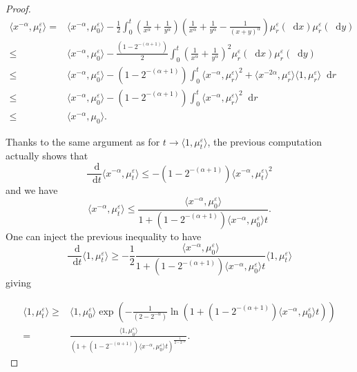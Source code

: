 \documentclass[a4paper,11pt, reqno]{amsart}
\newcommand{\eps}{\varepsilon}
\newcommand{\dd}{\mathop{}\!\mathrm{d}}
\newcommand{\1}{\mathbbm{1}}
\theoremstyle{plain}
\theoremstyle{definition}
\begin{document}
{\begin{proof}
  \begin{align*}
    \langle x^{- \alpha}, \mu^{\eps}_t \rangle = & \langle x^{-
    \alpha}, \mu^{\eps}_0 \rangle - \frac{1}{2} \int_0^t \left(
    \frac{1}{x^{\alpha}} + \frac{1}{y^{\alpha}} \right) \left(
    \frac{1}{x^{\alpha}} + \frac{1}{y^{\alpha}} - \frac{1}{(x + y)^{\alpha}}
    \right) \mu^{\eps}_r (\dd x) \mu^{\eps}_r (\dd y)\\
    \le & \langle x^{- \alpha}, \mu^{\eps}_0 \rangle - \frac{(1 -
    2^{- (\alpha + 1)})}{2} \int_0^t \left( \frac{1}{x^{\alpha}} +
    \frac{1}{y^{\alpha}} \right)^2 \mu^{\eps}_r (\dd x)
    \mu^{\eps}_r (\dd y)\\
    \le & \langle x^{- \alpha}, \mu^{\eps}_0 \rangle - (1 - 2^{-
    (\alpha + 1)}) \int_0^t \langle x^{- \alpha}, \mu_r^{\eps}
    \rangle^2 + \langle x^{- 2 \alpha}, \mu_r^{\eps} \rangle \langle 1,
    \mu_r^{\eps} \rangle \dd r\\
    \le & \langle x^{- \alpha}, \mu^{\eps}_0 \rangle - (1 - 2^{-
    (\alpha + 1)}) \int_0^t \langle x^{- \alpha}, \mu_r^{\eps}
    \rangle^2 \dd r\\
    \le & \langle x^{- \alpha}, \mu_0 \rangle .
  \end{align*}
  
  Thanks to the same argument as for $t \rightarrow \langle 1,
  \mu_t^{\eps} \rangle$, the previous computation actually shows that
  \[ \frac{\dd}{\dd t} \langle x^{- \alpha}, \mu^{\eps}_t
     \rangle \le - (1 - 2^{- (\alpha + 1)}) \langle x^{- \alpha},
     \mu_t^{\eps} \rangle^2 \]
  and we have
  \[ \langle x^{- \alpha}, \mu^{\eps}_t \rangle \le \frac{\langle
     x^{- \alpha}, \mu^{\eps}_0 \rangle}{1 + (1 - 2^{- (\alpha + 1)})
     \langle x^{- \alpha}, \mu^{\eps}_0 \rangle t} . \]
  One can inject the previous inequality to have
  \[ \frac{\dd}{\dd t} \langle 1, \mu_t^{\eps} \rangle \ge
     - \frac{1}{2} \frac{\langle x^{- \alpha}, \mu^{\eps}_0 \rangle}{1
     + (1 - 2^{- (\alpha + 1)}) \langle x^{- \alpha}, \mu^{\eps}_0
     \rangle t} \langle 1, \mu_t^{\eps} \rangle \]
  giving
  
  \begin{align*}
    \langle 1, \mu^{\eps}_t \rangle \ge & \langle 1,
    \mu^{\eps}_0 \rangle \exp \left( - \frac{1}{(2 - 2^{- \alpha})} \ln
    (1 + (1 - 2^{- (\alpha + 1)}) \langle x^{- \alpha}, \mu^{\eps}_0
    \rangle t) \right)\\
    = & \frac{\langle 1, \mu^{\eps}_0 \rangle}{(1 + (1 - 2^{- (\alpha +
    1)}) \langle x^{- \alpha}, \mu^{\eps}_0 \rangle t)^{\frac{1}{2 -
    2^{- \alpha}}}} .
  \end{align*}
  

\end{proof}}
\end{document}
